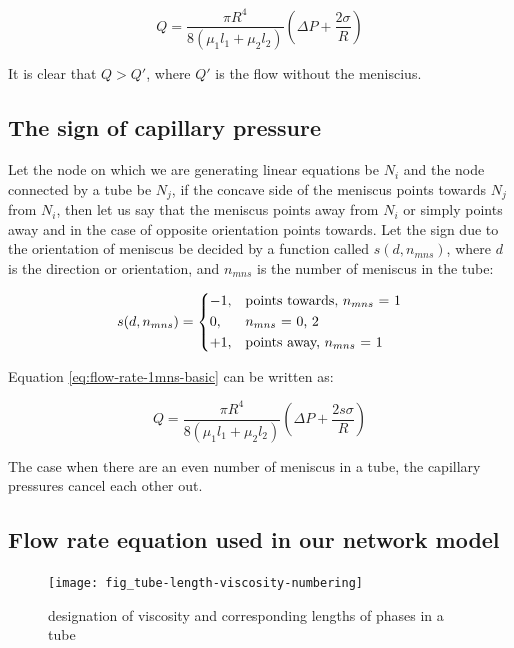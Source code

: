 	\begin{equation} \label{eq:flow-rate-1mns-basic}
		Q = \frac{\pi R^4}{8({\mu}_1 l_1 + {\mu}_2 l_2)} \left( \Delta P + \frac{2\sigma}{R} \right)
	\end{equation}
	
	It is clear that $Q > Q'$, where $Q'$ is the flow without the meniscius.
	
	
\subsection{The sign of capillary pressure}

	Let the node on which we are generating linear equations be $N_i$ and the node connected by a tube be $N_j$, if the concave side of the meniscus points towards $N_j$ from $N_i$, then let us say that the meniscus points away from $N_i$ or simply points away and in the case of opposite orientation points towards. Let the sign due to the orientation of meniscus be decided by a function called $s(d, n_{mns})$, where $d$ is the direction or orientation, and $n_{mns}$ is the number of meniscus in the tube:
	
	\begin{equation}
		s(d, n_{mns}) = 
		\begin{dcases}
			-1,&\text{points towards, $n_{mns}$ = 1}\\
			0,&\text{$n_{mns}$ = 0, 2}\\
			+1,&\text{points away, $n_{mns}$ = 1}
		\end{dcases}
	\end{equation}

	Equation \ref{eq:flow-rate-1mns-basic} can be written as:
	
	\begin{equation} \label{eq:flow-rate-1mns-complex}
		Q = \frac{\pi R^4}{8({\mu}_1 l_1 + {\mu}_2 l_2)} \left( \Delta P + \frac{2s\sigma}{R} \right)
	\end{equation}
	
	The case when there are an even number of meniscus in a tube, the capillary pressures cancel each other out.

\subsection{Flow rate equation used in our network model}
	\begin{figure}[H]
		\texttt{[image: fig\_tube-length-viscosity-numbering]}
		\caption{designation of viscosity and corresponding lengths of phases in a tube}
		\label{fig_tube-length-viscosity-numbering}
	\end{figure}
	
